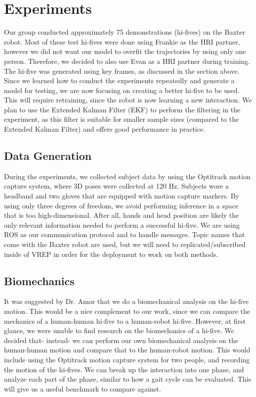 \documentclass[letterpaper, 10 pt, conference]{ieeeconf}  %
\begin{document}
\section{Experiments}
\indent Our group conducted approximately 75 demonstrations (hi-fives) on the Baxter robot. Most of these test hi-fives were done using Frankie as the HRI partner, however we did not want our model to overfit the trajectories by using only one person. Therefore, we decided to also use Evan as a HRI partner during training. The hi-five was generated using key frames, as discussed in the section above. Since we learned how to conduct the experiments repeatedly and generate a model for testing, we are now focusing on creating a better hi-five to be used. This will require retraining, since the robot is now learning a new interaction. We plan to use the Extended Kalman Filter (EKF) to perform the filtering in the experiment, as this filter is suitable for smaller sample sizes (compared to the Extended Kalman Filter) and offers good performance in practice.

\subsection{Data Generation}
During the experiments, we collected subject data by using the Optitrack motion capture system, where 3D poses were collected at 120 Hz. Subjects wore a headband and two gloves that are equipped with motion capture markers. By using only three degrees of freedom, we avoid performing inference in a space that is too high-dimensional. After all, hands and head position are likely the only relevant information needed to perform a successful hi-five. We are using ROS as our communication protocol and to handle messages. Topic names that come with the Baxter robot are used, but we will need to replicated/subscribed inside of VREP in order for the deployment to work on both methods.

\subsection{Biomechanics}
It was suggested by Dr. Amor that we do a biomechanical analysis on the hi-five motion. This would be a nice complement to our work, since we can compare the mechanics of a human-human hi-five to a human-robot hi-five. However, at first glance, we were unable to find research on the biomechanics of a hi-five. We decided that- instead- we can perform our own biomechanical analysis on the human-human motion and compare that to the human-robot motion. This would include using the Optitrack motion capture system for two people, and recording the motion of the hi-fives. We can break up the interaction into one phase, and analyze each part of the phase, similar to how a gait cycle can be evaluated. This will give us a useful benchmark to compare against.
\end{document}
